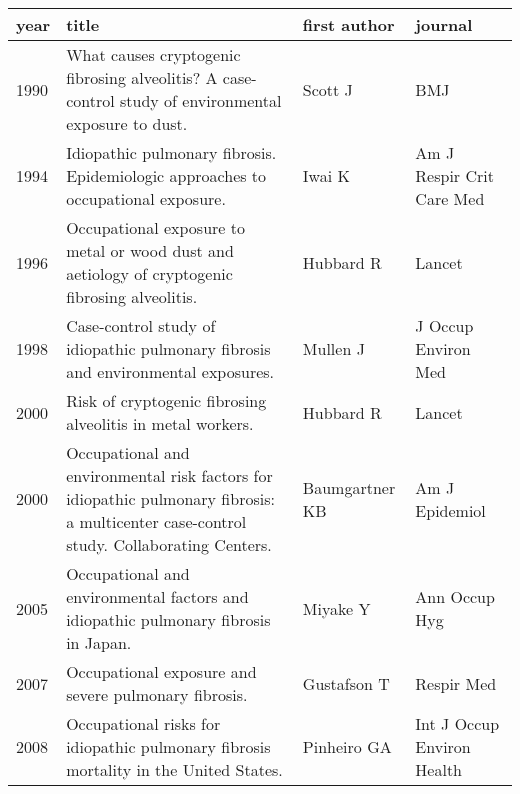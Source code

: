 \documentclass[a4paper,12pt]{article}
\begin{document}
\begin{table}
    \begin{tabular}{lp{6cm}ll}
    \textbf{year} & \textbf{title} &      \textbf{first author} &        \textbf{journal} \\
    \midrule
            1990    &                                    What causes cryptogenic fibrosing alveolitis? A case-control study of environmental exposure to dust. &                    Scott J &                         BMJ \\
            1994    &                                                        Idiopathic pulmonary fibrosis. Epidemiologic approaches to occupational exposure. &                     Iwai K &   Am J Respir Crit Care Med \\
            1996    &                                           Occupational exposure to metal or wood dust and aetiology of cryptogenic fibrosing alveolitis. &                  Hubbard R &                      Lancet \\
            1998    &                                                         Case-control study of idiopathic pulmonary fibrosis and environmental exposures. &                   Mullen J &         J Occup Environ Med \\
            2000    &                                                                               Risk of cryptogenic fibrosing alveolitis in metal workers. &                  Hubbard R &                      Lancet \\
            2000    &  Occupational and environmental risk factors for idiopathic pulmonary fibrosis: a multicenter case-control study. Collaborating Centers. &             Baumgartner KB &              Am J Epidemiol \\
            2005    &                                                       Occupational and environmental factors and idiopathic pulmonary fibrosis in Japan. &                   Miyake Y &               Ann Occup Hyg \\
            2007    &                                                                                     Occupational exposure and severe pulmonary fibrosis. &                Gustafson T &                  Respir Med \\
            2008    &                                                     Occupational risks for idiopathic pulmonary fibrosis mortality in the United States. &                Pinheiro GA &  Int J Occup Environ Health \\

\end{tabular}
\end{table}
\end{document}
